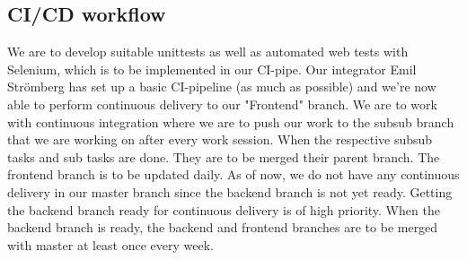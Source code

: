 \subsection{CI/CD workflow}
We are to develop suitable unittests as well as automated web tests with Selenium, which is to be implemented in our CI-pipe. Our integrator Emil Strömberg has set up a basic CI-pipeline (as much as possible) and we're now able to perform continuous delivery to our "Frontend" branch. We are to work with continuous integration where we are to push our work to the subsub branch that we are working on after every work session. When the respective subsub tasks and sub tasks are done. They are to be merged their parent branch. The frontend branch is to be updated daily. As of now, we do not have any continuous delivery in our master branch since the backend branch is not yet ready. Getting the backend branch ready for continuous delivery is of high priority. When the backend branch is ready, the backend and frontend branches are to be merged with master at least once every week. 

